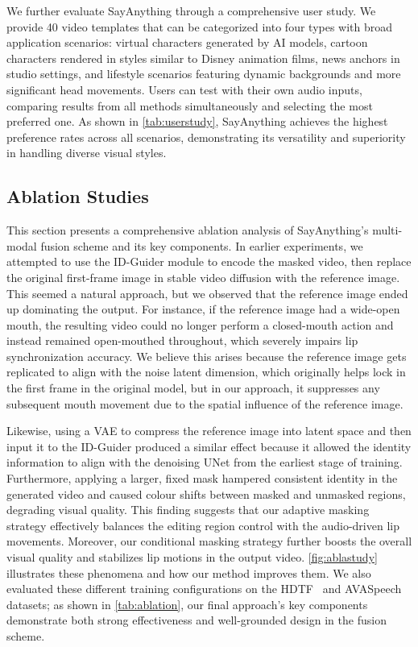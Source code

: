 We further evaluate SayAnything through a comprehensive user study. We provide 40 video templates that can be categorized into four types with broad application scenarios: virtual characters generated by AI models, cartoon characters rendered in styles similar to Disney animation films, news anchors in studio settings, and lifestyle scenarios featuring dynamic backgrounds and more significant head movements. Users can test with their own audio inputs, comparing results from all methods simultaneously and selecting the most preferred one. As shown in \cref{tab:userstudy}, SayAnything achieves the highest preference rates across all scenarios, demonstrating its versatility and superiority in handling diverse visual styles.



\subsection{Ablation Studies}

This section presents a comprehensive ablation analysis of SayAnything’s multi-modal fusion scheme and its key components. In earlier experiments, we attempted to use the ID-Guider module to encode the masked video, then replace the original first-frame image in stable video diffusion with the reference image. This seemed a natural approach, but we observed that the reference image ended up dominating the output. For instance, if the reference image had a wide-open mouth, the resulting video could no longer perform a closed-mouth action and instead remained open-mouthed throughout, which severely impairs lip synchronization accuracy. We believe this arises because the reference image gets replicated to align with the noise latent dimension, which originally helps lock in the first frame in the original model, but in our approach, it suppresses any subsequent mouth movement due to the spatial influence of the reference image.

Likewise, using a VAE to compress the reference image into latent space and then input it to the ID-Guider produced a similar effect because it allowed the identity information to align with the denoising UNet from the earliest stage of training. Furthermore, applying a larger, fixed mask hampered consistent identity in the generated video and caused colour shifts between masked and unmasked regions, degrading visual quality. This finding suggests that our adaptive masking strategy effectively balances the editing region control with the audio-driven lip movements. Moreover, our conditional masking strategy further boosts the overall visual quality and stabilizes lip motions in the output video. \cref{fig:ablastudy} illustrates these phenomena and how our method improves them. We also evaluated these different training configurations on the HDTF~\citep{zhang2021flow} and AVASpeech~\citep{chaudhuri2018ava} datasets; as shown in \cref{tab:ablation}, our final approach’s key components demonstrate both strong effectiveness and well-grounded design in the fusion scheme.



